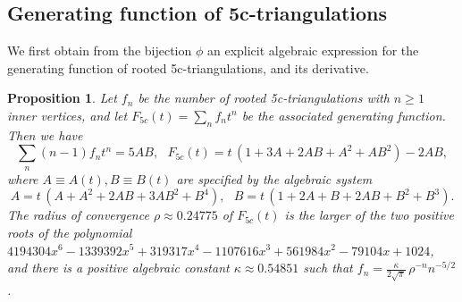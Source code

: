 \documentclass[letter]{amsart}
\numberwithin{theo}{section}
\newtheorem{prop}[theo]{Proposition}
\theoremstyle{remark}
\def\Ffc{F_{5c}}
\begin{document}
\subsection{Generating function of 5c-triangulations}

We first obtain from the bijection $\phi$ an explicit algebraic expression for the generating function of rooted 5c-triangulations, and its derivative. 

\begin{prop}\label{prop:count5c}
Let $f_n$ be the number of rooted 5c-triangulations with $n\geq 1$ inner vertices, and let $\Ffc(t)=\sum_nf_nt^n$ be the associated generating function. Then we have
\[
\sum_n (n-1)f_nt^n=5AB,\ \ \ \Ffc(t)=t\,(1+3A+2AB+A^2+AB^2)-2AB,
\]
where $A\equiv A(t),B\equiv B(t)$ are specified by the algebraic system
\begin{equation}\label{eq:AB}
A=t\,(A+A^2+2AB+3AB^2+B^4),\ \ \ B=t\,(1+2A+B+2AB+B^2+B^3).
\end{equation}
The radius of convergence $\rho\approx 0.24775$ of $\Ffc(t)$ is the larger of the two positive roots of the polynomial $4194304x^6 - 1339392x^5 + 319317x^4 - 1107616x^3 + 561984x^2 - 79104x + 1024$, and there is a positive algebraic constant $\kappa\approx 0.54851$
 such that $f_n= \frac{\kappa}{2\sqrt{\pi}}\,\rho^{-n}n^{-5/2}$. 
\end{prop}
\end{document}
